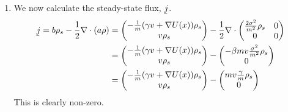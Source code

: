\documentclass[12pt]{article}
\theoremstyle{plain}
\theoremstyle{definition}
\theoremstyle{remark}
\begin{document}
\begin{enumerate}
\begin{enumerate}
      \item %
        We now calculate the steady-state flux, $\underaccent{\bar}{j}$.
        \begin{align*}
          \underaccent{\bar}{j}
          =
          b\rho_s - \frac{1}{2}\nabla \cdot(a\rho)
          &=
          \begin{pmatrix}
            -\frac{1}{m} (\gamma v + \nabla U(x)) \rho_s\\
            v\rho_s
          \end{pmatrix}
          - \frac{1}{2}
          \nabla \cdot
          \begin{pmatrix}
            \frac{2\sigma^2}{m^2}\rho_s & 0 \\
            0 & 0
          \end{pmatrix}\\
          &=
          \begin{pmatrix}
            -\frac{1}{m} (\gamma v + \nabla U(x)) \rho_s\\
            v\rho_s
          \end{pmatrix}
          -
          \begin{pmatrix}
            -\beta mv \frac{\sigma^2}{m^2}\rho_s \\
            0
          \end{pmatrix}\\
          &=
          \begin{pmatrix}
            -\frac{1}{m} (\gamma v + \nabla U(x)) \rho_s\\
            v\rho_s
          \end{pmatrix}
          -
          \begin{pmatrix}
            mv \frac{\gamma}{m}\rho_s \\
            0
          \end{pmatrix}
        \end{align*}
        This is clearly non-zero.


    \end{enumerate}
\end{enumerate}
\end{document}
